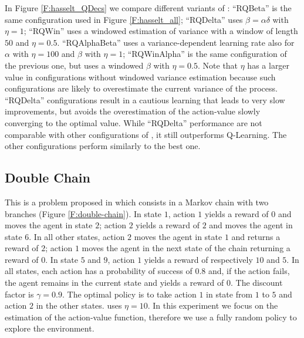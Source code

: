 \documentclass[conference]{IEEEtran}
\begin{document}
In Figure \ref{F:hasselt_QDecs} we compare different variants of \alg: ``RQBeta'' is the same configuration used in Figure \ref{F:hasselt_all}; ``RQDelta'' uses $\beta = \alpha \delta$ with $\eta = 1$; ``RQWin'' uses a windowed estimation of variance with a window of length $50$ and $\eta = 0.5$. ``RQAlphaBeta'' uses a variance-dependent learning rate also for $\alpha$ with $\eta = 100$ and $\beta$ with $\eta = 1$; ``RQWinAlpha'' is the same configuration of the previous one, but uses a windowed $\beta$ with $\eta = 0.5$. Note that $\eta$ has a larger value in configurations without windowed variance estimation because such configurations are likely to overestimate the current variance of the process. ``RQDelta'' configurations result in a cautious learning that leads to very slow improvements, but avoids the overestimation of the action-value slowly converging to the optimal value. While ``RQDelta'' performance are not comparable with other configurations of \alg, it still outperforms Q-Learning. The other configurations perform similarly to the best one.

\subsection{Double Chain}
This is a problem proposed in \cite{Peters2010RelativeEP} which consists in a Markov chain with two branches (Figure \ref{F:double-chain}). In state $1$, action $1$ yields a reward of $0$ and moves the agent in state $2$; action $2$ yields a reward of $2$ and moves the agent in state $6$. In all other states, action $2$ moves the agent in state $1$ and returns a reward of $2$; action $1$ moves the agent in the next state of the chain returning a reward of $0$. In state $5$ and $9$, action $1$ yields a reward of respectively $10$ and $5$. In all states, each action has a probability of success of $0.8$ and, if the action fails, the agent remains in the current state and yields a reward of $0$. The discount factor is $\gamma = 0.9$. The optimal policy is to take action $1$ in state from $1$ to $5$ and action $2$ in the other states. \alg uses $\eta = 10$. In this experiment we focus on the estimation of the action-value function, therefore we use a fully random policy to explore the environment.
\end{document}
